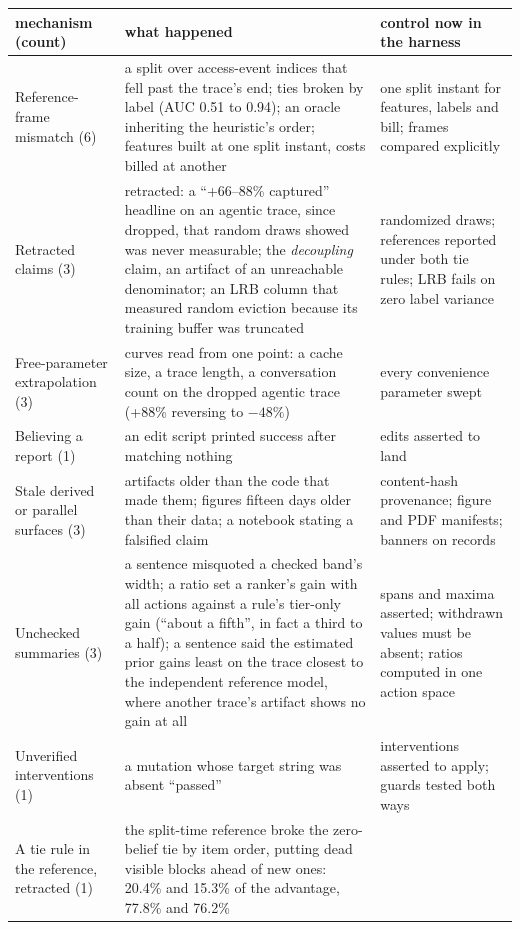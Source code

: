 \begin{table}[t]
\centering\footnotesize
\begin{tabular}{@{}p{3.2cm}p{8.6cm}p{4.9cm}@{}}
\toprule
mechanism (count) & what happened & control now in the harness \\
\midrule
Reference-frame mismatch (6) & a split over access-event indices that fell past the trace's end; ties
broken by label (AUC 0.51 to 0.94); an oracle inheriting the heuristic's order; features built at one
split instant, costs billed at another & one split instant for features, labels and bill; frames compared
explicitly \\
Retracted claims (3) & retracted: a ``+66--88\% captured'' headline on an agentic trace, since dropped, that random draws showed
was never measurable; the \emph{decoupling} claim, an artifact of an unreachable denominator; an LRB column that
measured random eviction because its training buffer was truncated & randomized draws; references reported
under both tie rules; LRB fails on zero label variance \\
Free-parameter extrapolation (3) & curves read from one point: a cache size, a trace length, a
conversation count on the dropped agentic trace (+88\% reversing to $-48\%$) & every convenience parameter swept \\
Believing a report (1) & an edit script printed success after matching nothing & edits asserted to land \\
Stale derived or parallel surfaces (3) & artifacts older than the code that made them; figures fifteen
days older than their data; a notebook stating a falsified claim & content-hash provenance; figure and
PDF manifests; banners on records \\
Unchecked summaries (3) & a sentence misquoted a checked band's width; a ratio set a ranker's gain
with all actions against a rule's tier-only gain (``about a fifth'', in fact a third to a half); a
sentence said the estimated prior gains least on the trace closest to the independent reference model,
where another trace's artifact shows no gain at all & spans
and maxima asserted; withdrawn values must be absent; ratios computed in one action space \\
Unverified interventions (1) & a mutation whose target string was absent ``passed'' & interventions
asserted to apply; guards tested both ways \\
A tie rule in the reference, retracted (1) & the split-time reference broke the zero-belief tie by item order,
putting dead visible blocks ahead of new ones: 20.4\% and 15.3\% of the advantage, 77.8\% and 76.2\%

\end{tabular}
\end{table}
